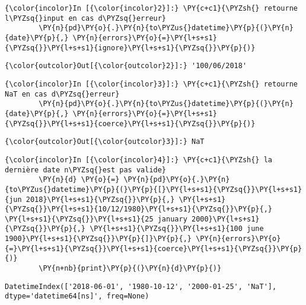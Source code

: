    \begin{Verbatim}[commandchars=\\\{\}]
{\color{incolor}In [{\color{incolor}2}]:} \PY{c+c1}{\PYZsh{} retourne l\PYZsq{}input en cas d\PYZsq{}erreur}
        \PY{n}{pd}\PY{o}{.}\PY{n}{to\PYZus{}datetime}\PY{p}{(}\PY{n}{date}\PY{p}{,} \PY{n}{errors}\PY{o}{=}\PY{l+s+s1}{\PYZsq{}}\PY{l+s+s1}{ignore}\PY{l+s+s1}{\PYZsq{}}\PY{p}{)}
\end{Verbatim}


\begin{Verbatim}[commandchars=\\\{\}]
{\color{outcolor}Out[{\color{outcolor}2}]:} '100/06/2018'
\end{Verbatim}
            
    \begin{Verbatim}[commandchars=\\\{\}]
{\color{incolor}In [{\color{incolor}3}]:} \PY{c+c1}{\PYZsh{} retourne NaT en cas d\PYZsq{}erreur}
        \PY{n}{pd}\PY{o}{.}\PY{n}{to\PYZus{}datetime}\PY{p}{(}\PY{n}{date}\PY{p}{,} \PY{n}{errors}\PY{o}{=}\PY{l+s+s1}{\PYZsq{}}\PY{l+s+s1}{coerce}\PY{l+s+s1}{\PYZsq{}}\PY{p}{)}
\end{Verbatim}


\begin{Verbatim}[commandchars=\\\{\}]
{\color{outcolor}Out[{\color{outcolor}3}]:} NaT
\end{Verbatim}
            
    \begin{Verbatim}[commandchars=\\\{\}]
{\color{incolor}In [{\color{incolor}4}]:} \PY{c+c1}{\PYZsh{} la dernière date n\PYZsq{}est pas valide}
        \PY{n}{d} \PY{o}{=} \PY{n}{pd}\PY{o}{.}\PY{n}{to\PYZus{}datetime}\PY{p}{(}\PY{p}{[}\PY{l+s+s1}{\PYZsq{}}\PY{l+s+s1}{jun 2018}\PY{l+s+s1}{\PYZsq{}}\PY{p}{,} \PY{l+s+s1}{\PYZsq{}}\PY{l+s+s1}{10/12/1980}\PY{l+s+s1}{\PYZsq{}}\PY{p}{,} \PY{l+s+s1}{\PYZsq{}}\PY{l+s+s1}{25 january 2000}\PY{l+s+s1}{\PYZsq{}}\PY{p}{,} \PY{l+s+s1}{\PYZsq{}}\PY{l+s+s1}{100 june 1900}\PY{l+s+s1}{\PYZsq{}}\PY{p}{]}\PY{p}{,} \PY{n}{errors}\PY{o}{=}\PY{l+s+s1}{\PYZsq{}}\PY{l+s+s1}{coerce}\PY{l+s+s1}{\PYZsq{}}\PY{p}{)}
        \PY{n+nb}{print}\PY{p}{(}\PY{n}{d}\PY{p}{)}
\end{Verbatim}


    \begin{Verbatim}[commandchars=\\\{\}]
DatetimeIndex(['2018-06-01', '1980-10-12', '2000-01-25', 'NaT'], dtype='datetime64[ns]', freq=None)

    \end{Verbatim}

